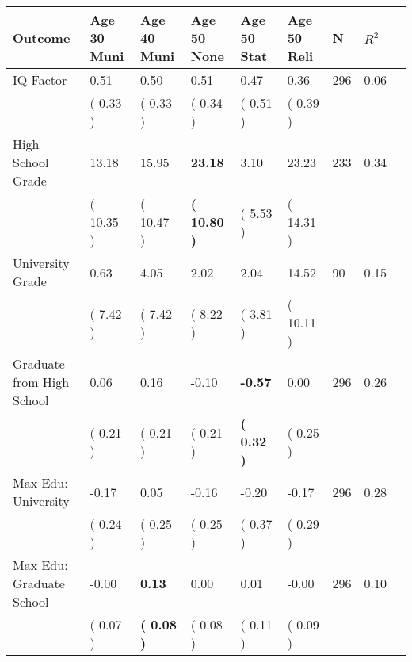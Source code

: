 \begin{tabular}{L{6.2cm} C{1.8cm} C{1.8cm} C{1.8cm} C{1.8cm} C{1.8cm} C{1.8cm} C{0.3cm} C{0.3cm}}
\toprule
 \textbf{Outcome} & \textbf{Age 30 Muni} & \textbf{Age 40 Muni} & \textbf{Age 50 None} & \textbf{Age 50 Stat} & \textbf{Age 50 Reli} & \textbf{N} & \textbf{$ R^2$} \\
\midrule
IQ Factor &      0.51 &      0.50 &      0.51 &      0.47 &      0.36  & 296 &       0.06 \\ 
 & (     0.33 ) & (     0.33 ) & (     0.34 ) & (     0.51 ) & (     0.39 )  & \\
High School Grade &     13.18 &     15.95 & \textbf{    23.18} &      3.10 &     23.23  & 233 &       0.34 \\ 
 & (    10.35 ) & (    10.47 ) & \textbf{(    10.80 )} & (     5.53 ) & (    14.31 )  & \\
University Grade &      0.63 &      4.05 &      2.02 &      2.04 &     14.52  & 90 &       0.15 \\ 
 & (     7.42 ) & (     7.42 ) & (     8.22 ) & (     3.81 ) & (    10.11 )  & \\
Graduate from High School &      0.06 &      0.16 &     -0.10 & \textbf{    -0.57} &      0.00  & 296 &       0.26 \\ 
 & (     0.21 ) & (     0.21 ) & (     0.21 ) & \textbf{(     0.32 )} & (     0.25 )  & \\
Max Edu: University &     -0.17 &      0.05 &     -0.16 &     -0.20 &     -0.17  & 296 &       0.28 \\ 
 & (     0.24 ) & (     0.25 ) & (     0.25 ) & (     0.37 ) & (     0.29 )  & \\
Max Edu: Graduate School &     -0.00 & \textbf{     0.13} &      0.00 &      0.01 &     -0.00  & 296 &       0.10 \\ 
 & (     0.07 ) & \textbf{(     0.08 )} & (     0.08 ) & (     0.11 ) & (     0.09 )  & \\
\bottomrule
\end{tabular}
